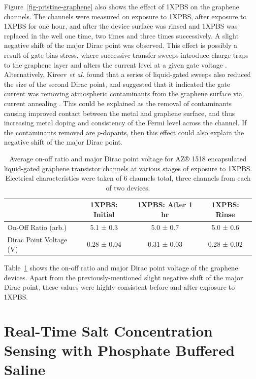\documentclass[
  a4paper,
]{scrbook}
\begin{document}
Figure~\ref{fig-pristine-graphene} also shows the effect of 1XPBS on the
graphene channels. The channels were measured on exposure to 1XPBS,
after exposure to 1XPBS for one hour, and after the device surface was
rinsed and 1XPBS was replaced in the well one time, two times and three
times successively. A slight negative shift of the major Dirac point was
observed. This effect is possibly a result of gate bias stress, where
successive transfer sweeps introduce charge traps to the graphene layer
and alters the current level at a given gate voltage
\autocite{Bargaoui2018,Noyce2019}. Alternatively, Kireev \emph{et al.}
found that a series of liquid-gated sweeps also reduced the size of the
second Dirac point, and suggested that it indicated the gate current was
removing atmospheric contaminants from the graphene surface via current
annealing \autocite{Kireev2017}. This could be explained as the removal
of contaminants causing improved contact between the metal and graphene
surface, and thus increasing metal doping and consistency of the Fermi
level across the channel. If the contaminants removed are \(p\)-dopants,
then this effect could also explain the negative shift of the major
Dirac point.

\hypertarget{tbl-graphene-parameters}{}
\begin{table}
\caption{\label{tbl-graphene-parameters}Average on-off ratio and major Dirac point voltage for AZ® 1518
encapsulated liquid-gated graphene transistor channels at various stages
of exposure to 1XPBS. Electrical characteristics were taken of 6
channels total, three channels from each of two devices. }\tabularnewline

\centering
\begin{tabular}{lccc}
\toprule
 & 1XPBS: Initial & 1XPBS: After 1 hr & 1XPBS: Rinse\\
\midrule
On-Off Ratio (arb.) & 5.1 ± 0.3 & 5.0 ± 0.7 & 5.0 ± 0.6\\
Dirac Point Voltage (V) & 0.28 ± 0.04 & 0.31 ± 0.03 & 0.28 ± 0.02\\
\bottomrule
\end{tabular}
\end{table}

Table~\ref{tbl-graphene-parameters} shows the on-off ratio and major
Dirac point voltage of the graphene devices. Apart from the
previously-mentioned slight negative shift of the major Dirac point,
these values were highly consistent before and after exposure to 1XPBS.

\hypertarget{sec-dummy-sensing}{%
\section{Real-Time Salt Concentration Sensing with Phosphate Buffered
Saline}\label{sec-dummy-sensing}}
\end{document}
